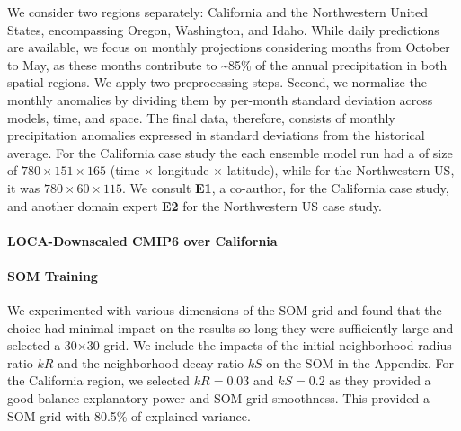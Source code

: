 We consider two regions separately: California and the Northwestern United States, encompassing Oregon, Washington, and Idaho.
%
While daily predictions are available, we focus on monthly projections considering months from October to May, as these months contribute to \textasciitilde85\% of the annual precipitation in both spatial regions.
%
We apply two preprocessing steps. 
%
Second, we normalize the monthly anomalies by dividing them by per-month standard deviation across models, time, and space.
%
The final data, therefore, consists of monthly precipitation anomalies expressed in standard deviations from the historical average.
%
For the California case study the each ensemble model run had a of size of $780\times 151\times 165$ (time $\times$ longitude $\times$ latitude), while for the Northwestern US, it was $780\times 60\times 115$.
%
We consult \textbf{E1}, a co-author, for the California case study, and another domain expert \textbf{E2} for the Northwestern US case study.



\paragraph{LOCA-Downscaled CMIP6 over California}
\paragraph{SOM Training}
We experimented with various dimensions of the SOM grid and found that the choice had minimal impact on the results so long they were sufficiently large and selected a 30$\times$30 grid.
%
We include the impacts of the initial neighborhood radius ratio $kR$ and the neighborhood decay ratio $kS$ on the SOM in the Appendix.
%
For the California region, we selected $kR=0.03$ and $kS=0.2$ as they provided a good balance explanatory power and SOM grid smoothness.
%
This provided a SOM grid with 80.5\% of explained variance.
